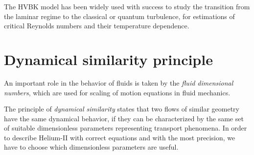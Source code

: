 The HVBK model has been widely used with success to study the transition from the laminar regime to the classical or quantum turbulence, for estimations of critical Reynolds numbers and their temperature dependence.

\newpage


\section{Dynamical similarity principle}

An important role in the behavior of fluids is taken by the \textit{fluid dimensional numbers}, which are used for scaling of motion equations in fluid mechanics.

The principle of \textit{dynamical similarity} states that two flows of similar geometry have the same dynamical behavior, if they can be characterized by the same set of suitable dimensionless parameters representing transport phenomena. In order to describe Helium-II with correct equations and with the most precision, we have to choose which dimensionless parameters are useful.

